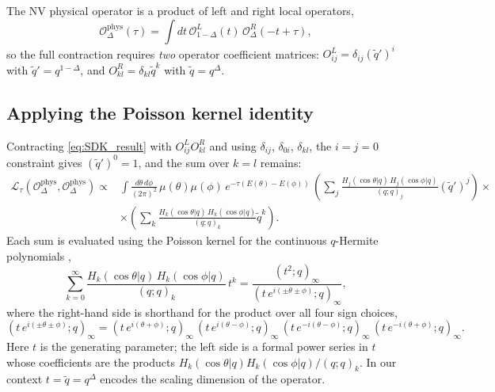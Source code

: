 \documentclass[12pt]{article}
\newcommand{\phys}{\mathrm{phys}}
\begin{document}
The NV physical operator is a product of left and right local operators,
\begin{equation}
    \mathcal{O}^\phys_\Delta(\tau) = \int dt\,\mathcal{O}^L_{1-\Delta}(t)\,\mathcal{O}^R_\Delta(-t+\tau),
\end{equation}
so the full contraction requires \emph{two} operator coefficient matrices:
$O^L_{ij} = \delta_{ij}(\tilde{q}')^i$ with $\tilde{q}' = q^{1-\Delta}$, and
$O^R_{kl} = \delta_{kl}\tilde{q}^k$ with $\tilde{q} = q^\Delta$.

\subsection{Applying the Poisson kernel identity}

Contracting \eqref{eq:SDK_result} with $O^L_{ij}O^R_{kl}$ and using $\delta_{ij}$,
$\delta_{0i}$, $\delta_{kl}$, the $i=j=0$ constraint gives $(\tilde{q}')^0=1$,
and the sum over $k=l$ remains:
\begin{align}
    \mathcal{L}_\tau(\mathcal{O}^\phys_\Delta, \mathcal{O}^\phys_\Delta)
    \propto
    &\int\frac{d\theta\,d\phi}{(2\pi)^2}\,\mu(\theta)\mu(\phi)\,
    e^{-\tau(E(\theta)-E(\phi))}\,
    \left(\sum_j \frac{H_j(\cos\theta| q)\,H_j(\cos\phi| q)}{(q;q)_j}(\tilde{q}')^j\right)\times \nonumber\\
    &\times\left(\sum_k \frac{H_k(\cos\theta| q)\,H_k(\cos\phi| q)}{(q;q)_k}\tilde{q}^k\right).
    \label{eq:double_sum}
\end{align}
Each sum is evaluated using the Poisson kernel for
the continuous $q$-Hermite polynomials \cite{Berkooz2019},
\begin{equation}
    \sum_{k=0}^\infty \frac{H_k(\cos\theta| q)\,H_k(\cos\phi| q)}{(q;q)_k}\,t^k
    = \frac{(t^2;q)_\infty}{(t\,e^{i(\pm\theta\pm\phi)};q)_\infty},
    \label{eq:Poisson_kernel}
\end{equation}
where the right-hand side is shorthand for the product over all four sign choices,
\begin{equation}
    (t\,e^{i(\pm\theta\pm\phi)};q)_\infty
    = (t\,e^{i(\theta+\phi)};q)_\infty\,(t\,e^{i(\theta-\phi)};q)_\infty\,
      (t\,e^{-i(\theta-\phi)};q)_\infty\,(t\,e^{-i(\theta+\phi)};q)_\infty.
\end{equation}
Here $t$ is the generating parameter; the left side is a formal power series in $t$
whose coefficients are the products $H_k(\cos\theta| q)H_k(\cos\phi| q)/(q;q)_k$.
In our context $t = \tilde{q} = q^\Delta$ encodes the scaling dimension of the operator.
\end{document}
